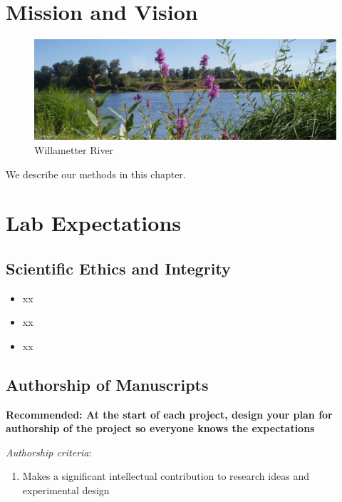 \documentclass[
]{book}
\providecommand{\tightlist}{%
  \setlength{\itemsep}{0pt}\setlength{\parskip}{0pt}}
\begin{document}
\hypertarget{mission-and-vision}{%
\chapter{Mission and Vision}\label{mission-and-vision}}

\begin{figure}
\centering
\includegraphics{images/willamette_header.jpg}
\caption{Willametter River}
\end{figure}

We describe our methods in this chapter.

\hypertarget{lab-expectations}{%
\chapter{Lab Expectations}\label{lab-expectations}}

\hypertarget{scientific-ethics-and-integrity}{%
\section{Scientific Ethics and Integrity}\label{scientific-ethics-and-integrity}}

\begin{itemize}
\tightlist
\item
  xx
\item
  xx
\item
  xx
\end{itemize}

\hypertarget{authorship-of-manuscripts}{%
\section{Authorship of Manuscripts}\label{authorship-of-manuscripts}}

\textbf{Recommended: At the start of each project, design your plan for authorship of the project so
everyone knows the expectations}

\emph{Authorship criteria}:

\begin{enumerate}
\def\labelenumi{\arabic{enumi})}
\tightlist
\item
  Makes a significant intellectual contribution to research ideas and experimental design
\end{enumerate}
\end{document}
